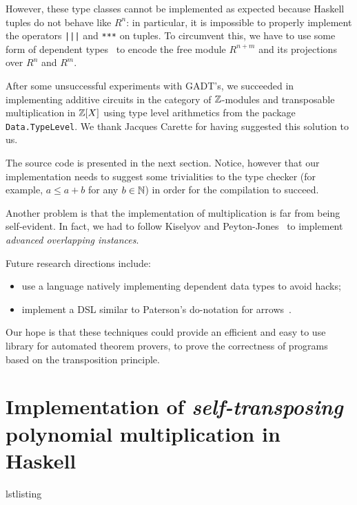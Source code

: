 However, these type classes cannot be implemented as expected because
Haskell tuples do not behave like $R^n$: in particular, it is
impossible to properly implement the operators \lstinline+|||+ and
\lstinline+***+ on tuples. To circumvent this, we have to use some
form of dependent types~\cite{kiselyov+lammel+schupke04,mcbride01} to
encode the free module $R^{n+m}$ and its projections over $R^n$ and
$R^m$.

After some unsuccessful experiments with GADT's, we succeeded in
implementing additive circuits in the category of $\mathbb{Z}$-modules and
transposable multiplication in $\mathbb{Z}[X]$ using type level arithmetics
from the package \lstinline+Data.TypeLevel+. We thank Jacques Carette
for having suggested this solution to us.

The source code is presented in the next section. Notice, however that
our implementation needs to suggest some trivialities to the type
checker (for example, $a\le a+b$ for any $b\in\mathbb{N}$) in order for the
compilation to succeed. 

Another problem is that the implementation of multiplication is far
from being self-evident. In fact, we had to follow Kiselyov and
Peyton-Jones~\cite{jones+kiselyov:advanced+overlap08} to implement
\emph{advanced overlapping instances}.

Future research directions include:
\begin{itemize}
\item use a language natively implementing dependent data types to
  avoid hacks;
\item implement a DSL similar to Paterson's do-notation for
  arrows~\cite{paterson01}.
\end{itemize}
Our hope is that these techniques could provide an efficient and easy
to use library for automated theorem provers, to prove the correctness
of programs based on the transposition principle.


\section[\emph{Self-transposing} polynomial
multiplication]{Implementation of \emph{self-transposing} polynomial
  multiplication in Haskell}
\label{sec:impl-emphs-transp}


\begin{xcomment}{lstlisting}

\end{xcomment}



\renewcommand{\C}{\mathbb{C}}



%
